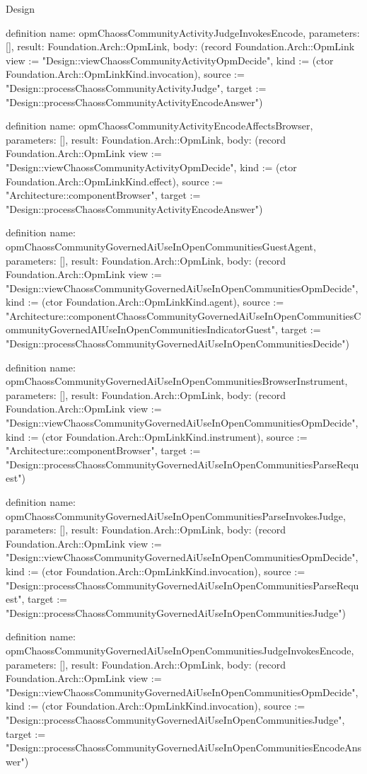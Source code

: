 \begin{lexlean}{Design}
\begin{semanticmodule}
definition{
  name: opmChaossCommunityActivityJudgeInvokesEncode,
  parameters: [],
  result: Foundation.Arch::OpmLink,
  body: (record Foundation.Arch::OpmLink {view := "Design::viewChaossCommunityActivityOpmDecide", kind := (ctor Foundation.Arch::OpmLinkKind.invocation), source := "Design::processChaossCommunityActivityJudge", target := "Design::processChaossCommunityActivityEncodeAnswer"})
}

definition{
  name: opmChaossCommunityActivityEncodeAffectsBrowser,
  parameters: [],
  result: Foundation.Arch::OpmLink,
  body: (record Foundation.Arch::OpmLink {view := "Design::viewChaossCommunityActivityOpmDecide", kind := (ctor Foundation.Arch::OpmLinkKind.effect), source := "Architecture::componentBrowser", target := "Design::processChaossCommunityActivityEncodeAnswer"})
}

definition{
  name: opmChaossCommunityGovernedAiUseInOpenCommunitiesGuestAgent,
  parameters: [],
  result: Foundation.Arch::OpmLink,
  body: (record Foundation.Arch::OpmLink {view := "Design::viewChaossCommunityGovernedAiUseInOpenCommunitiesOpmDecide", kind := (ctor Foundation.Arch::OpmLinkKind.agent), source := "Architecture::componentChaossCommunityGovernedAiUseInOpenCommunitiesCommunityGovernedAIUseInOpenCommunitiesIndicatorGuest", target := "Design::processChaossCommunityGovernedAiUseInOpenCommunitiesDecide"})
}

definition{
  name: opmChaossCommunityGovernedAiUseInOpenCommunitiesBrowserInstrument,
  parameters: [],
  result: Foundation.Arch::OpmLink,
  body: (record Foundation.Arch::OpmLink {view := "Design::viewChaossCommunityGovernedAiUseInOpenCommunitiesOpmDecide", kind := (ctor Foundation.Arch::OpmLinkKind.instrument), source := "Architecture::componentBrowser", target := "Design::processChaossCommunityGovernedAiUseInOpenCommunitiesParseRequest"})
}

definition{
  name: opmChaossCommunityGovernedAiUseInOpenCommunitiesParseInvokesJudge,
  parameters: [],
  result: Foundation.Arch::OpmLink,
  body: (record Foundation.Arch::OpmLink {view := "Design::viewChaossCommunityGovernedAiUseInOpenCommunitiesOpmDecide", kind := (ctor Foundation.Arch::OpmLinkKind.invocation), source := "Design::processChaossCommunityGovernedAiUseInOpenCommunitiesParseRequest", target := "Design::processChaossCommunityGovernedAiUseInOpenCommunitiesJudge"})
}

definition{
  name: opmChaossCommunityGovernedAiUseInOpenCommunitiesJudgeInvokesEncode,
  parameters: [],
  result: Foundation.Arch::OpmLink,
  body: (record Foundation.Arch::OpmLink {view := "Design::viewChaossCommunityGovernedAiUseInOpenCommunitiesOpmDecide", kind := (ctor Foundation.Arch::OpmLinkKind.invocation), source := "Design::processChaossCommunityGovernedAiUseInOpenCommunitiesJudge", target := "Design::processChaossCommunityGovernedAiUseInOpenCommunitiesEncodeAnswer"})
}


\end{semanticmodule}
\end{lexlean}
